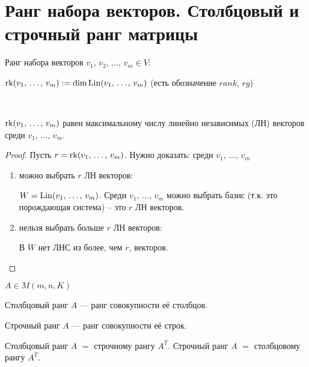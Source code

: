 
\section{Ранг набора векторов. Столбцовый и строчный ранг матрицы}

\begin{conj} 

    Ранг набора векторов $v_1,\, v_2,\, \dots,\, v_m \in V$: 
    
    $\operatorname{rk}(v_1,\, \dots,\, v_m) := \dim \operatorname{Lin}(v_1,\, \dots,\, v_m)$ (есть обозначение $rank$, $rg$)

\end{conj}
\
\begin{theorem-non} 
    
    $\operatorname{rk}(v_1,\, \dots,\, v_m)$ равен максимальному числу линейно независимых (ЛН) векторов среди $v_1,\, \dots,\, v_m$.
    \begin{proof}
        
        Пусть $r = \operatorname{rk}(v_1,\, \dots,\, v_m)$. Нужно доказать: среди $v_1,\, \dots,\, v_m$

        \begin{enumerate}
            \item можно выбрать $r$ ЛН векторов:
            
            $W = \operatorname{Lin}(v_1,\, \dots,\, v_m)$. 
            Среди $v_1,\, \dots,\, v_m$ можно выбрать базис (т.к. это порождающая система) -- это $r$ ЛН векторов.
            \item нельзя выбрать больше $r$ ЛН векторов:
            
            В $W$ нет ЛНС из более, чем $r$, векторов.
        \end{enumerate}
        
    \end{proof}
\end{theorem-non}

\begin{conj} 

    $A \in M(m, n, K)$

    Столбцовый ранг $A$ --- ранг совокупности её столбцов.

    Строчный ранг $A$ --- ранг совокупности её строк.

\end{conj}

\notice Столбцовый ранг $A$ $=$ строчному рангу $A^T$. Строчный ранг $A$ $=$ столбцовому рангу $A^T$.

